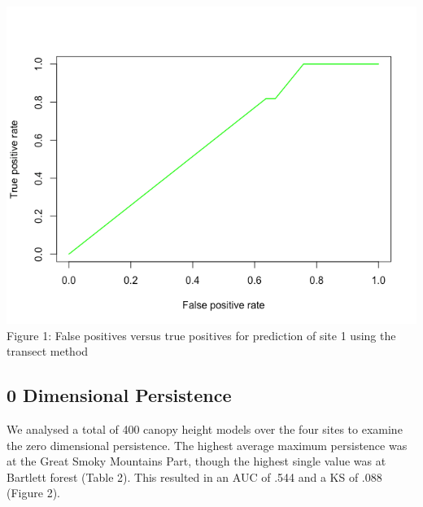 \documentclass[10pt]{article}
\begin{document}
\includegraphics[scale = 0.5]{transect_roc}\\
Figure 1: False positives versus true positives for prediction of site 1 using the transect method


\subsection*{0 Dimensional Persistence}

We analysed a total of 400 canopy height models over the four sites to examine the zero dimensional persistence. The highest average maximum persistence was at the Great Smoky Mountains Part, though the highest single value was at Bartlett forest (Table 2). This resulted in an AUC of .544 and a KS of .088 (Figure 2).\\
\end{document}
